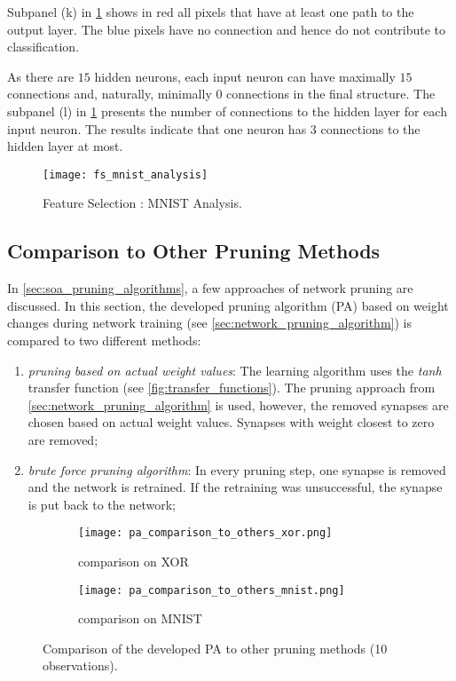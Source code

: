 Subpanel (k) in \cref{fig:mnist_analysis} shows in red all pixels that have at least one path to the output layer. The blue pixels have no connection and hence do not contribute to classification.

As there are $ 15 $ hidden neurons, each input neuron can have maximally $ 15 $ connections and, naturally, minimally $ 0 $ connections in the final structure. The subpanel (l) in \cref{fig:mnist_analysis} presents the number of connections to the hidden layer for each input neuron. The results indicate that one neuron has $ 3 $ connections to the hidden layer at most. 

\begin{figure}[H]
  \centering
  \texttt{[image: fs\_mnist\_analysis]}
  \caption{Feature Selection : MNIST Analysis.}
  \label{fig:mnist_analysis}
\end{figure}

\subsection{Comparison to Other Pruning Methods} \label{comparison_to_other_pa}
In \cref{sec:soa_pruning_algorithms}, a few approaches of network pruning are discussed. In this section, the developed pruning algorithm (PA) based on weight changes during network training (see \cref{sec:network_pruning_algorithm}) is compared to two different methods:

\begin{enumerate}[label=\Alph*]
\item \textit{pruning based on actual weight values}: The learning algorithm uses the \textit{tanh} transfer function (see \cref{fig:transfer_functions}). The pruning approach from \cref{sec:network_pruning_algorithm} is used, however, the removed synapses are chosen based on actual weight values. Synapses with weight closest to zero are removed;
\item \textit{brute force pruning algorithm}: 
In every pruning step, one synapse is removed and the network is retrained. If the retraining was unsuccessful, the synapse is put back to the network;
\end{enumerate}

\begin{figure}[H]
\centering
\begin{subfigure}{0.49\textwidth}
  \centering
  \texttt{[image: pa\_comparison\_to\_others\_xor.png]}
  \caption{comparison on XOR}
  \label{fig:pa_comparison_xor}
\end{subfigure}%
\begin{subfigure}{0.49\textwidth}
  \centering
  \texttt{[image: pa\_comparison\_to\_others\_mnist.png]}
  \caption{comparison on MNIST}
  \label{fig:pa_comparison_mnist}
\end{subfigure}
\caption{Comparison of the developed PA to other pruning methods (10 observations).}
\label{fig:pa_comparison}
\end{figure}

